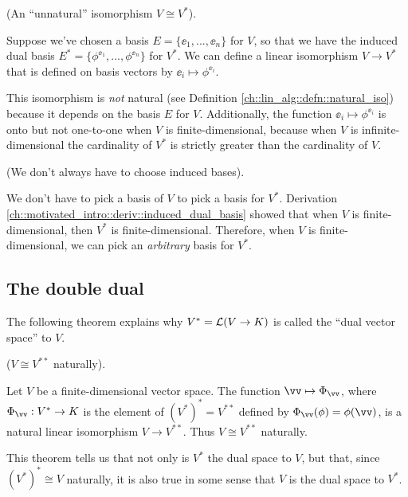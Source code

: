 \begin{remark}
\label{ch::motivated_intro::rmk::unnatural_iso_V_V*}
    (An ``unnatural'' isomorphism $V \cong V^*$).
    
    Suppose we've chosen a basis $E = \{\ee_1, ..., \ee_n\}$ for $V$, so that we have the induced dual basis ${E^* = \{\phi^{\ee_1}, ..., \phi^{\ee_n}\}}$ for $V^*$. We can define a linear isomorphism $V \rightarrow V^*$ that is defined on basis vectors by $\ee_i \mapsto \phi^{\ee_i}$.
    
    This isomorphism is \textit{not} natural (see Definition \ref{ch::lin_alg::defn::natural_iso}) because it depends on the basis $E$ for $V$. Additionally, the function $\ee_i \mapsto \phi^{\ee_i}$ is onto but not one-to-one when $V$ is finite-dimensional, because when $V$ is infinite-dimensional the cardinality of $V^*$ is strictly greater than the cardinality of $V$.    
\end{remark}

\begin{remark}
    (We don't always have to choose induced bases).
    
    We don't have to pick a basis of $V$ to pick a basis for $V^*$. Derivation \ref{ch::motivated_intro::deriv::induced_dual_basis} showed that when $V$ is finite-dimensional, then $V^*$ is finite-dimensional. Therefore, when $V$ is finite-dimensional, we can pick an \textit{arbitrary} basis for $V^*$.
\end{remark}

\subsection*{The double dual}

The following theorem explains why $V^* = \mathcal{L}(V \rightarrow K)$ is called the ``dual vector space'' to $V$.
\begin{theorem}
\label{ch::motivated_intro::thm::V_iso_double_dual}
    ($V \cong V^{**}$ naturally). 
    
    Let $V$ be a finite-dimensional vector space. The function $\vv \mapsto \Phi_\vv$, where $\Phi_\vv:V^* \rightarrow K$ is the element of $(V^*)^* = V^{**}$ defined by $\Phi_\vv(\phi) = \phi(\vv)$, is a natural linear isomorphism $V \rightarrow V^{**}$. Thus $V \cong V^{**}$ naturally.

    This theorem tells us that not only is $V^*$ the dual space to $V$, but that, since $(V^*)^* \cong V$ naturally, it is also true in some sense that $V$ is the dual space to $V^*$.
\end{theorem}

